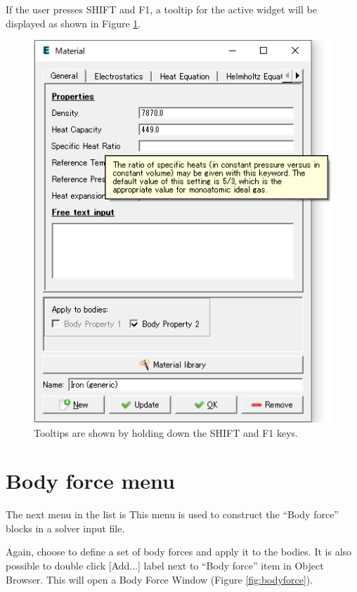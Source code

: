 If the user presses SHIFT and F1, a tooltip for the active widget will be displayed as shown in Figure \ref{fig:tooltip}.

\begin{figure}[htb]
	\begin{center}
		\includegraphics[scale=0.5]{images/tooltip.png}
		\caption{Tooltips are shown by holding down the SHIFT and F1 keys.}
		\label{fig:tooltip}
	\end{center}
\end{figure}

\section{Body force menu}

The next menu in the list is
 This menu is used to construct the ``Body force'' blocks in a
solver input file.

\noindent Again, choose
\noindent to define a set of body forces and apply it to the bodies. It is also possible to double click [Add...] label next to ``Body force'' item in Object Browser. This will open a Body Force Window (Figure \ref{fig:bodyforce}).

